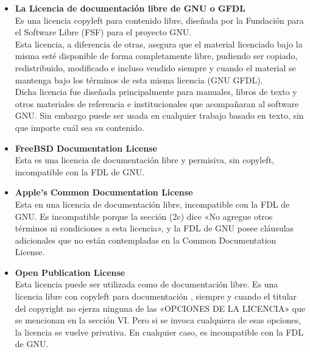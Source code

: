 \begin{itemize}
\item {\bf La Licencia de documentación libre de GNU o GFDL}\\
Es una licencia copyleft para contenido libre, diseñada por la Fundación para el Software Libre (FSF) para el proyecto GNU. \\
Esta licencia, a diferencia de otras, asegura que el material licenciado bajo la misma esté disponible de forma completamente libre, pudiendo ser copiado, redistribuido, modificado e incluso vendido siempre y cuando el material se mantenga bajo los términos de esta misma licencia (GNU GFDL). \\
Dicha licencia fue diseñada principalmente para manuales, libros de texto y otros materiales de referencia e institucionales que acompañaran al software GNU. Sin embargo puede ser usada en cualquier trabajo basado en texto, sin que importe cuál sea su contenido.
\item {\bf FreeBSD Documentation License}\\
Esta es una licencia de documentación libre y permisiva, sin copyleft, incompatible con la FDL de GNU.
\item {\bf Apple's Common Documentation License}\\
Esta en una licencia de documentación libre, incompatible con la FDL de GNU. Es incompatible porque la sección (2c) dice «No agregue otros términos ni condiciones a esta licencia», y la FDL de GNU posee cláusulas adicionales que no están contempladas en la Common Documentation License.
\item {\bf Open Publication License}\\
Esta licencia puede ser utilizada como de documentación libre. Es una licencia libre con copyleft para documentación , siempre y cuando el titular del copyright no ejerza ninguna de las «OPCIONES DE LA LICENCIA» que se mencionan en la sección VI. Pero si se invoca cualquiera de esas opciones, la licencia se vuelve privativa. En cualquier caso, es incompatible con la FDL de GNU.

    
\end{itemize}